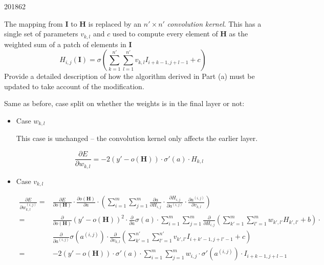 \documentclass[10pt,\jkfside,a4paper]{article}
\begin{document}
\begin{examquestion}{2018}{6}{2}
\begin{enumerate}[label=(\alph*)]
The mapping from $\mathbf I$ to $\mathbf H$ is replaced by an $n' \times n'$
\textit{convolution kernel}. This has a single set of parameters $v_{k, l}$
and $c$ used to compute every element of $\mathbf H$ as the weighted sum of a
patch of elements in $\mathbf I$
\[
H_{i, j}(\mathbf I) = \sigma \left(
\sum^{n'}_{k=1}
\sum^{n'}_{l=1}
v_{k, l} I_{i + k - 1, j + l - 1} + c
\right)
\]
Provide a detailed description of how the algorithm derived in Part (a) must
be updated to take account of the modification.

Same as before, case split on whether the weights is in the final layer or not:

\begin{itemize}

\item Case $w_{k, l}$

This case is unchanged -- the convolution kernel only affects the earlier
layer.

\[
\frac{\partial E}{\partial w_{k, l}}
=
-2(y' - o(\mathbf H)) \cdot \sigma'(a) \cdot H_{k, l}
\]

\item Case $v_{k, l}$

\begin{align}
\frac{\partial E}{\partial w^{(i, j)}_{k, l}}
=&
\frac{\partial E}{\partial o(\mathbf H)}
\cdot
\frac{\partial o(\mathbf H)}{\partial a}
\cdot
\left(
\sum^{m}_{i=1} \sum^{m}_{j=1}
\frac{\partial a}{\partial H_{i, j}}
\cdot
\frac{\partial H_{i, j}}{\partial a^{(i, j)}}
\cdot
\frac{\partial a^{(i, j)}}{\partial v_{k, l}}
\right)
\\
=&
\frac{\partial}{\partial o(\mathbf H)}(y' - o(\mathbf H))^2
\cdot
\frac{\partial}{\partial a}\sigma(a)
\cdot
\sum^{m}_{i=1} \sum^{m}_{j=1}
\frac{\partial}{\partial H_{i, j}}
\left(
\sum^{m}_{k'=1} \sum^{m}_{l'=1} w_{k', l'} H_{k', l'} + b
\right)
\cdot
\\
&
\frac{\partial}{\partial a^{(i, j)}}\sigma(a^{(i, j)})
\cdot
\frac{\partial}{\partial v_{k, l}}
\left(
\sum^{n'}_{k'=1} \sum^{n'}_{l'=1} v_{k', l'}I_{i + k' - 1, j + l' - 1} + c
\right)
\\
=&
-2(y' - o(\mathbf H))
\cdot
\sigma'(a)
\cdot
\sum^{m}_{i=1} \sum^{m}_{j=1}
w_{i, j}
\cdot
\sigma'(a^{(i, j)})
\cdot
I_{i + k - 1, j + l - 1}
\\
\end{align}

\end{itemize}

\end{enumerate}

\end{examquestion}
\end{document}
